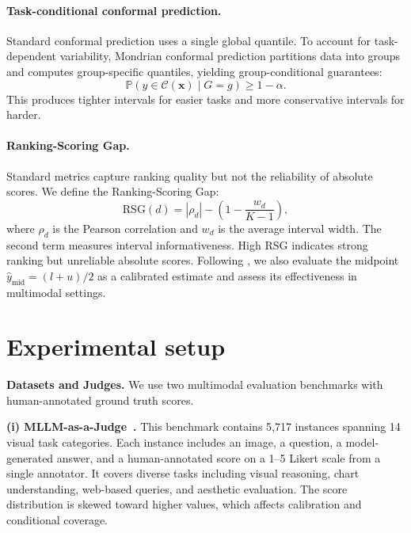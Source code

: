 \documentclass{article}
\begin{document}
\paragraph{Task-conditional conformal prediction.}
Standard conformal prediction uses a single global quantile. To account for task-dependent variability, Mondrian conformal prediction partitions data into groups and computes group-specific quantiles, yielding group-conditional guarantees:
\begin{equation}
\mathbb{P}(y \in \mathcal{C}(\mathbf{x}) \mid G = g) \geq 1 - \alpha.
\end{equation}
This produces tighter intervals for easier tasks and more conservative intervals for harder.

\paragraph{Ranking-Scoring Gap.}
Standard metrics capture ranking quality but not the reliability of absolute scores. We define the Ranking-Scoring Gap:
\begin{equation}
\text{RSG}(d) = |\rho_d| - \left(1 - \frac{w_d}{K - 1}\right),
\end{equation}
where $\rho_d$ is the Pearson correlation and $w_d$ is the average interval width. The second term measures interval informativeness. High RSG indicates strong ranking but unreliable absolute scores. Following \citet{sheng2025analyzing}, we also evaluate the midpoint $\hat{y}_{\text{mid}} = (l + u)/2$ as a calibrated estimate and assess its effectiveness in multimodal settings.

\section{Experimental setup}
\label{sec:setup}

\textbf{Datasets and Judges.}
We use two multimodal evaluation benchmarks with human-annotated ground truth scores.

\textbf{(i) MLLM-as-a-Judge~\citep{chen2024mllmasajudge}.}
This benchmark contains 5,717 instances spanning 14 visual task categories. Each instance includes an image, a question, a model-generated answer, and a human-annotated score on a 1--5 Likert scale from a single annotator. It covers diverse tasks including visual reasoning, chart understanding, web-based queries, and aesthetic evaluation. The score distribution is skewed toward higher values, which affects calibration and conditional coverage.
\end{document}

